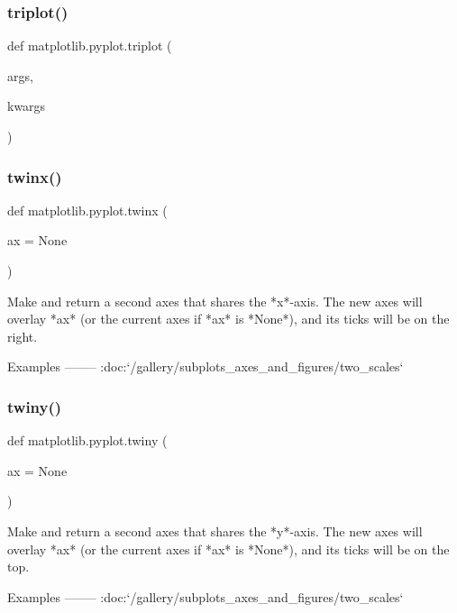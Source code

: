 \subsubsection{\texorpdfstring{triplot()}{triplot()}}
{\footnotesize\ttfamily def matplotlib.\+pyplot.\+triplot (\begin{DoxyParamCaption}\item[{}]{args,  }\item[{}]{kwargs }\end{DoxyParamCaption})}

\mbox{\label{namespacematplotlib_1_1pyplot_a1f7275c0a074da1bf2312d6c739db877}} 
\subsubsection{\texorpdfstring{twinx()}{twinx()}}
{\footnotesize\ttfamily def matplotlib.\+pyplot.\+twinx (\begin{DoxyParamCaption}\item[{}]{ax = {\ttfamily None} }\end{DoxyParamCaption})}

\begin{DoxyVerb}Make and return a second axes that shares the *x*-axis.  The new axes will
overlay *ax* (or the current axes if *ax* is *None*), and its ticks will be
on the right.

Examples
--------
:doc:`/gallery/subplots_axes_and_figures/two_scales`
\end{DoxyVerb}
 \mbox{\label{namespacematplotlib_1_1pyplot_aa5dcf3ca26ba51ee0d49138a7fcd33cf}} 
\subsubsection{\texorpdfstring{twiny()}{twiny()}}
{\footnotesize\ttfamily def matplotlib.\+pyplot.\+twiny (\begin{DoxyParamCaption}\item[{}]{ax = {\ttfamily None} }\end{DoxyParamCaption})}

\begin{DoxyVerb}Make and return a second axes that shares the *y*-axis.  The new axes will
overlay *ax* (or the current axes if *ax* is *None*), and its ticks will be
on the top.

Examples
--------
:doc:`/gallery/subplots_axes_and_figures/two_scales`
\end{DoxyVerb}
 \mbox{\label{namespacematplotlib_1_1pyplot_aaa524ea07152a2ee7eaa40a858604006}} 

